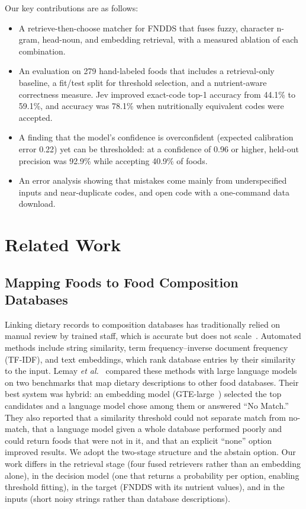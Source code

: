 \documentclass[11pt,journal,onecolumn]{IEEEtran}
\begin{document}
Our key contributions are as follows:
\begin{itemize}
\item A retrieve-then-choose matcher for FNDDS that fuses fuzzy, character n-gram, head-noun, and embedding retrieval, with a measured ablation of each combination.
\item An evaluation on 279 hand-labeled foods that includes a retrieval-only baseline, a fit/test split for threshold selection, and a nutrient-aware correctness measure. Jev improved exact-code top-1 accuracy from 44.1\% to 59.1\%, and accuracy was 78.1\% when nutritionally equivalent codes were accepted.
\item A finding that the model's confidence is overconfident (expected calibration error 0.22) yet can be thresholded: at a confidence of 0.96 or higher, held-out precision was 92.9\% while accepting 40.9\% of foods.
\item An error analysis showing that mistakes come mainly from underspecified inputs and near-duplicate codes, and open code with a one-command data download.
\end{itemize}

\section{Related Work}
\subsection{Mapping Foods to Food Composition Databases}
Linking dietary records to composition databases has traditionally relied on manual review by trained staff, which is accurate but does not scale~\cite{lemay}. Automated methods include string similarity, term frequency--inverse document frequency (TF-IDF), and text embeddings, which rank database entries by their similarity to the input. Lemay \emph{et al.}~\cite{lemay} compared these methods with large language models on two benchmarks that map dietary descriptions to other food databases. Their best system was hybrid: an embedding model (GTE-large~\cite{gte}) selected the top candidates and a language model chose among them or answered ``No Match.'' They also reported that a similarity threshold could not separate match from no-match, that a language model given a whole database performed poorly and could return foods that were not in it, and that an explicit ``none'' option improved results. We adopt the two-stage structure and the abstain option. Our work differs in the retrieval stage (four fused retrievers rather than an embedding alone), in the decision model (one that returns a probability per option, enabling threshold fitting), in the target (FNDDS with its nutrient values), and in the inputs (short noisy strings rather than database descriptions).
\end{document}
